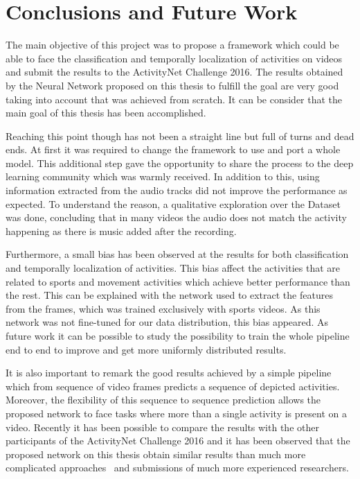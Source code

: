 \chapter{Conclusions and Future Work}

The main objective of this project was to propose a framework which could be able to face the classification and temporally localization of activities on videos and submit the results to the ActivityNet Challenge 2016. The results obtained by the Neural Network proposed on this thesis to fulfill the goal are very good taking into account that was achieved from scratch. It can be consider that the main goal of this thesis has been accomplished.

Reaching this point though has not been a straight line but full of turns and dead ends. At first it was required to change the framework to use and port a whole model. This additional step gave the opportunity to share the process to the deep learning community which was warmly received. In addition to this, using information extracted from the audio tracks did not improve the performance as expected. To understand the reason, a qualitative exploration over the Dataset was done, concluding that in many videos the audio does not match the activity happening as there is music added after the recording.

Furthermore, a small bias has been observed at the results for both classification and temporally localization of activities. This bias affect the activities that are related to sports and movement activities which achieve better performance than the rest. This can be explained with the network used to extract the features from the frames, which was trained exclusively with sports videos. As this network was not fine-tuned for our data distribution, this bias appeared. As future work it can be possible to study the possibility to train the whole pipeline end to end to improve and get more uniformly distributed results.

It is also important to remark the good results achieved by a simple pipeline which from sequence of video frames predicts a sequence of depicted activities. Moreover, the flexibility of this sequence to sequence prediction allows the proposed network to face tasks where more than a single activity is present on a video. Recently it has been possible to compare the results with the other participants of the ActivityNet Challenge 2016 and it has been observed that the proposed network on this thesis obtain similar results than much more complicated approaches~\cite{singhmulti} and submissions of much more experienced researchers.

